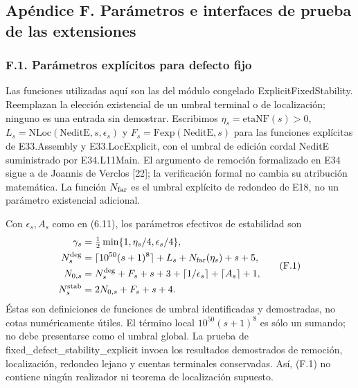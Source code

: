\documentclass[spanish,11pt,a4paper]{article}
\begin{document}
\subsection{Apéndice F. Parámetros e interfaces de prueba de las extensiones}\label{apendice-f.-parametros-e-interfaces-de-prueba-de-las-extensiones}

\subsubsection{F.1. Parámetros explícitos para defecto fijo}\label{f.1.-parametros-explicitos-para-defecto-fijo}

Las funciones utilizadas aquí son las del módulo congelado ExplicitFixedStability. Reemplazan la elección existencial de un umbral terminal o de localización; ninguno es una entrada sin demostrar. Escribimos \(\eta_s=\mathrm{etaNF}(s)>0\), \(L_s=\mathrm{NLoc}(\mathrm{NeditE},s,\epsilon_s)\) y \(F_s=\mathrm{Fexp}(\mathrm{NeditE},s)\) para las funciones explícitas de E33.Assembly y E33.LocExplicit, con el umbral de edición cordal NeditE suministrado por E34.L11Main. El argumento de remoción formalizado en E34 sigue a de Joannis de Verclos {[}22{]}; la verificación formal no cambia su atribución matemática. La función \(N_{\rm far}\) es el umbral explícito de redondeo de E18, no un parámetro existencial adicional.

Con \(\epsilon_s,A_s\) como en (6.11), los parámetros efectivos de estabilidad son \[
\begin{aligned}
\gamma_s&=\tfrac12\min\{1,\eta_s/4,\epsilon_s/4\},\\
N_s^{\rm deg}&=\lceil10^{50}(s+1)^8\rceil+L_s+
                    N_{\rm far}(\eta_s)+s+5,\\
N_{0,s}&=N_s^{\rm deg}+F_s+s+3+
                 \lceil1/\epsilon_s\rceil+\lceil A_s\rceil+1,\\
N_s^{\rm stab}&=2N_{0,s}+F_s+s+4.
\end{aligned}
\tag{F.1}
\] Éstas son definiciones de funciones de umbral identificadas y demostradas, no cotas numéricamente útiles. El término local \(10^{50}(s+1)^8\) es sólo un sumando; no debe presentarse como el umbral global. La prueba de {\ttfamily\small fixed\_\discretionary{\hbox{\ensuremath{\hookrightarrow}}}{}{}defect\_\discretionary{\hbox{\ensuremath{\hookrightarrow}}}{}{}stability\_\discretionary{\hbox{\ensuremath{\hookrightarrow}}}{}{}explicit} invoca los resultados demostrados de remoción, localización, redondeo lejano y cuentas terminales conservadas. Así, (F.1) no contiene ningún realizador ni teorema de localización supuesto.
\end{document}
